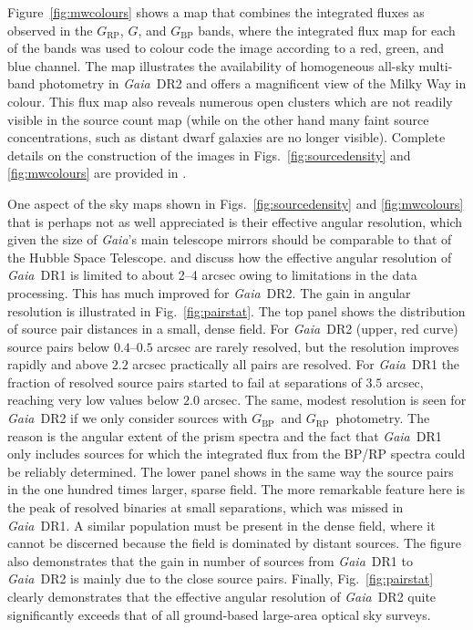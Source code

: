 \documentclass[longauth]{aa_gaia} %
\newcommand\gaia{\textit{Gaia}}
\newcommand\gdr[1]{\gaia~DR#1}
\newcommand\figref[1]{Fig.~\ref{#1}}
\newcommand\figsref[1]{Figs.~\ref{#1}}
\newcommand\figrefalt[1]{Figure~\ref{#1}}
\newcommand\gbp{\ensuremath{G_\mathrm{BP}}}
\newcommand\grp{\ensuremath{G_\mathrm{RP}}}
\begin{document}
\figrefalt{fig:mwcolours} shows a map that combines the integrated fluxes as observed in the {\grp},
$G$, and {\gbp} bands, where the integrated flux map for each of the bands was used to colour code
the image according to a red, green, and blue channel. The map illustrates the availability of
homogeneous all-sky multi-band photometry in \gdr{2} and offers a magnificent view of the Milky
Way in colour. This flux map also reveals numerous open clusters which are not readily visible in
the source count map (while on the other hand many faint source concentrations, such as distant
dwarf galaxies are no longer visible). Complete details on the construction of the images in
\figsref{fig:sourcedensity} and \ref{fig:mwcolours} are provided in \cite{DR2-DPACP-42}.

One aspect of the sky maps shown in \figsref{fig:sourcedensity} and \ref{fig:mwcolours} that is
perhaps not as well appreciated is their effective angular resolution, which given the size of
{\gaia}'s main telescope mirrors \citep[$1.45$~m along the scanning
direction,][]{2016A&A...595A...1G} should be comparable to that of the Hubble Space Telescope.
\cite{2016A&A...595A...2G} and \cite{2017A&A...599A..50A} discuss how the effective angular
resolution of \gdr{1} is limited to about 2--4 arcsec owing to limitations in the data processing.
This has much improved for \gdr{2}.  The gain in angular resolution is illustrated in
\figref{fig:pairstat}. The top panel shows the distribution of source pair distances in a small,
dense field. For \gdr{2} (upper, red curve) source pairs below $0.4$--$0.5$ arcsec are rarely
resolved, but the resolution improves rapidly and above $2.2$ arcsec practically all pairs are
resolved.  For \gdr{1} the fraction of resolved source pairs started to fail at separations of
$3.5$ arcsec, reaching very low values below $2.0$ arcsec. The same, modest resolution is seen for
\gdr{2} if we only consider sources with \gbp\ and \grp\ photometry. The reason is the angular
extent of the prism spectra and the fact that \gdr{1} only includes sources for which the
integrated flux from the BP/RP spectra could be reliably determined. The lower panel shows in the
same way the source pairs in the one hundred times larger, sparse field.  The more remarkable
feature here is the peak of resolved binaries at small separations, which was missed in \gdr{1}. A
similar population must be present in the dense field, where it cannot be discerned because the
field is dominated by distant sources. The figure also demonstrates that the gain in number of
sources from \gdr{1} to \gdr{2} is mainly due to the close source pairs.  Finally,
\figref{fig:pairstat} clearly demonstrates that the effective angular resolution of \gdr{2} quite
significantly exceeds that of all ground-based large-area optical sky surveys.
\end{document}
